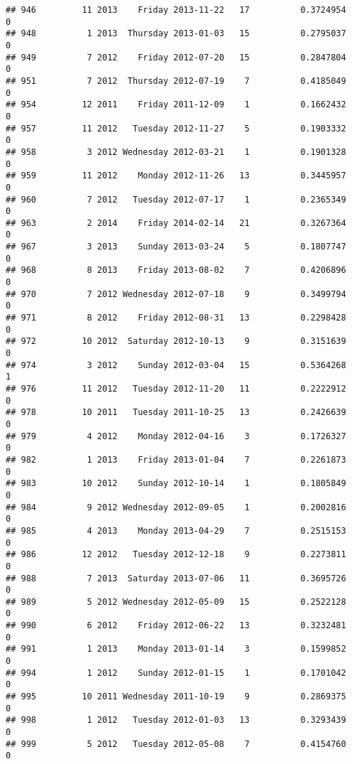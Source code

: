 \documentclass[
]{article}
\begin{document}
\begin{verbatim}
## 946         11 2013    Friday 2013-11-22   17          0.3724954             0
## 948          1 2013  Thursday 2013-01-03   15          0.2795037             0
## 949          7 2012    Friday 2012-07-20   15          0.2847804             0
## 951          7 2012  Thursday 2012-07-19    7          0.4185049             0
## 954         12 2011    Friday 2011-12-09    1          0.1662432             0
## 957         11 2012   Tuesday 2012-11-27    5          0.1903332             0
## 958          3 2012 Wednesday 2012-03-21    1          0.1901328             0
## 959         11 2012    Monday 2012-11-26   13          0.3445957             0
## 960          7 2012   Tuesday 2012-07-17    1          0.2365349             0
## 963          2 2014    Friday 2014-02-14   21          0.3267364             0
## 967          3 2013    Sunday 2013-03-24    5          0.1807747             0
## 968          8 2013    Friday 2013-08-02    7          0.4206896             0
## 970          7 2012 Wednesday 2012-07-18    9          0.3499794             0
## 971          8 2012    Friday 2012-08-31   13          0.2298428             0
## 972         10 2012  Saturday 2012-10-13    9          0.3151639             0
## 974          3 2012    Sunday 2012-03-04   15          0.5364268             1
## 976         11 2012   Tuesday 2012-11-20   11          0.2222912             0
## 978         10 2011   Tuesday 2011-10-25   13          0.2426639             0
## 979          4 2012    Monday 2012-04-16    3          0.1726327             0
## 982          1 2013    Friday 2013-01-04    7          0.2261873             0
## 983         10 2012    Sunday 2012-10-14    1          0.1805849             0
## 984          9 2012 Wednesday 2012-09-05    1          0.2002816             0
## 985          4 2013    Monday 2013-04-29    7          0.2515153             0
## 986         12 2012   Tuesday 2012-12-18    9          0.2273811             0
## 988          7 2013  Saturday 2013-07-06   11          0.3695726             0
## 989          5 2012 Wednesday 2012-05-09   15          0.2522128             0
## 990          6 2012    Friday 2012-06-22   13          0.3232481             0
## 991          1 2013    Monday 2013-01-14    3          0.1599852             0
## 994          1 2012    Sunday 2012-01-15    1          0.1701042             0
## 995         10 2011 Wednesday 2011-10-19    9          0.2869375             0
## 998          1 2012   Tuesday 2012-01-03   13          0.3293439             0
## 999          5 2012   Tuesday 2012-05-08    7          0.4154760             0

\end{verbatim}
\end{document}
